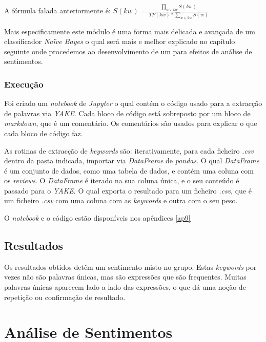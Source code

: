 A fórmula falada anteriormente é:
\begin{math}
    S(kw) = \frac{\prod_{w \in kw}^{} S(kw)}{TF(kw) * \sum_{w \in kw}^{}S(w)}
\end{math}

Mais especificamente este módulo é uma forma mais delicada e avançada de um classificador \textit{Naïve Bayes} \cite{tamgh1} \cite{tamyt1} \cite{tamyt2} \cite{tamyt3} o qual será mais e melhor explicado no capítulo seguinte onde procedemos ao desenvolvimento de um para efeitos de análise de sentimentos.

\subsubsection{Execução}

Foi criado um \textit{notebook} de \textit{Jupyter} o qual contém o código usado para a extracção de palavras via \textit{YAKE}. Cada bloco de código está sobreposto por um bloco de \textit{markdown}, que é um comentário. Os comentários são usados para explicar o que cada bloco de código faz.

As rotinas de extracção de \textit{keywords} são: iterativamente, para cada ficheiro \textit{.csv} dentro da pasta indicada, importar via \textit{DataFrame} de \textit{pandas}. O qual \textit{DataFrame} é um conjunto de dados, como uma tabela de dados, e contém uma coluna com os \textit{reviews}. O \textit{DataFrame} é iterado na sua coluna única, e o seu conteúdo é passado para o \textit{YAKE}. O qual exporta o resultado para um ficheiro \textit{.csv}, que é um ficheiro \textit{.csv} com uma coluna com as \textit{keywords} e outra com o seu peso.

O \textit{notebook} e o código estão disponíveis nos apêndices \autoref{ap9}

\subsection{Resultados}

Os resultados obtidos detêm um sentimento misto no grupo. Estas \textit{keywords} por vezes não são palavras únicas, mas são expressões que são frequentes. Muitas palavras únicas aparecem lado a lado das expressões, o que dá uma noção de repetição ou confirmação de resultado.

\section{Análise de Sentimentos}

